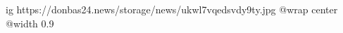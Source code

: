  
 
 
 
 

\ifcmt
  ig https://donbas24.news/storage/news/ukwl7vqedsvdy9ty.jpg
  @wrap center
  @width 0.9
\fi
